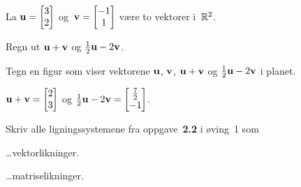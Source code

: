 

\begin{oppgave}
La $\mathbf{u} = \begin{bmatrix} 3 \\ 2 \end{bmatrix}$ og~$\mathbf{v} = \begin{bmatrix} -1 \\ 1 \end{bmatrix}$ være to vektorer
i~$\mathbb{R}^2$.

\begin{punkt}
Regn ut $\mathbf{u} + \mathbf{v}$ og $\frac{1}{2} \mathbf{u} - 2 \mathbf{v}$.
\end{punkt}

\begin{punkt}
Tegn en figur som viser vektorene $\mathbf{u}$, $\mathbf{v}$, $\mathbf{u} + \mathbf{v}$ og
$\frac{1}{2} \mathbf{u} - 2 \mathbf{v}$ i planet.
\end{punkt}

\end{oppgave}

\begin{losning}
\begin{punkt}
	$\mathbf{u} + \mathbf{v}=
	\begin{bmatrix}
	2\\
	3
	\end{bmatrix}
	$ og $\frac{1}{2} \mathbf{u} - 2 \mathbf{v}=
	\begin{bmatrix}
	\frac{7}{2}\\
	-1
	\end{bmatrix}
	$.
\end{punkt}

\begin{punkt}
\end{punkt}
\begin{center}
\end{center}

\end{losning}


\begin{oppgave}
Skriv alle ligningssystemene fra oppgave~\textbf{2.2} i øving~1 som

\begin{punkt}
\ldots vektorlikninger.
\end{punkt}

\begin{punkt}
\ldots matriselikninger.
\end{punkt}

\end{oppgave}

